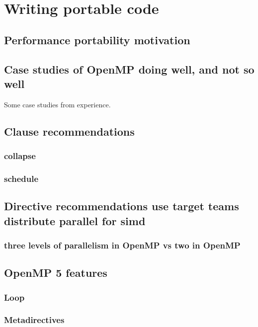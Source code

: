 

\chapter{Writing portable code}
\section{Performance portability motivation}
\section{Case studies of OpenMP doing well, and not so well}
Some case studies from experience.

\section{Clause recommendations}
\subsection{collapse}
\subsection{schedule}

\section{Directive recommendations use target teams distribute parallel for simd}
\subsection{three levels of parallelism in OpenMP vs two in OpenMP}

\section{OpenMP 5 features}
\subsection{Loop}
\subsection{Metadirectives}
